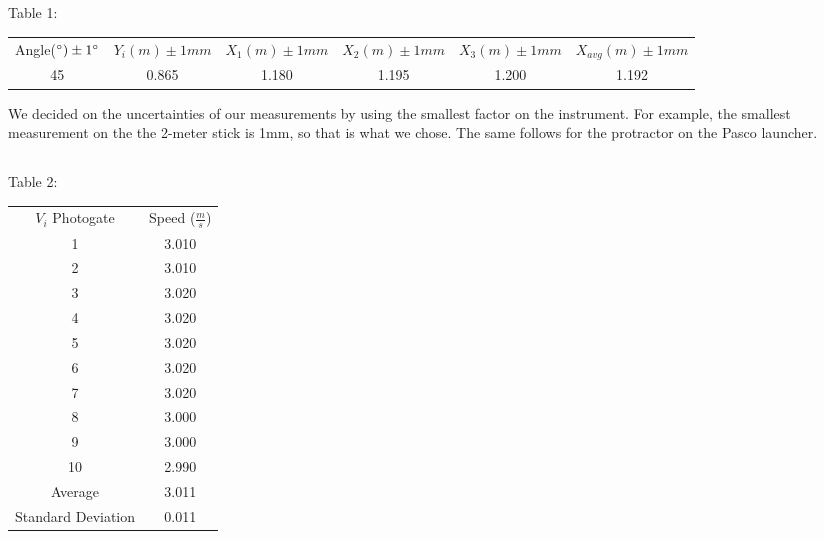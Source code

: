 \documentclass{article}
\begin{document}
\subsection*{}
\begin{center}Table 1:\end{center}
\begin{center}
\begin{tabular}{|c|c|c|c|c|c|}
Angle($\degree)\pm1\degree$ & $Y_i(m)\pm1mm$ & $X_1(m)\pm1mm$ & $X_2(m)\pm1mm$ & $X_3(m)\pm1mm$ & $X_{avg}(m) \pm1mm$\\
45                    & 0.865         & 1.180         & 1.195         & 1.200         & 1.192                
\end{tabular}
\end{center}
\bigskip
We decided on the uncertainties of our measurements by using the smallest factor on the instrument. For example, the smallest measurement on the the 2-meter stick is 1mm, so that is what we chose. The same follows for the protractor on the Pasco launcher.

\subsection*{}
\begin{center}Table 2:\end{center}
\begin{center}
\begin{tabular}{|c|c|}
$V_i$ Photogate    & Speed ($\frac{m}{s}$) \\
1                  & 3.010                 \\
2                  & 3.010                 \\
3                  & 3.020                 \\
4                  & 3.020                 \\
5                  & 3.020                 \\
6                  & 3.020                 \\
7                  & 3.020                 \\
8                  & 3.000                 \\
9                  & 3.000                 \\
10                 & 2.990                 \\
Average            & 3.011                 \\
Standard Deviation & 0.011                
\end{tabular}
\end{center}
\end{document}
